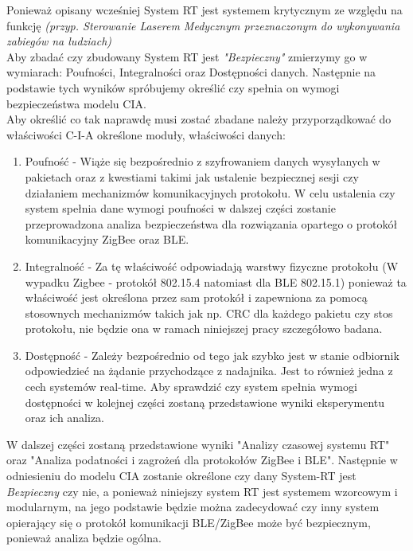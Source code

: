 \par
\tab Ponieważ opisany wcześniej System RT jest systemem krytycznym ze względu na funkcję \textit{(przyp. Sterowanie Laserem Medycznym przeznaczonym do wykonywania zabiegów na ludziach)} \\
Aby zbadać czy zbudowany System RT jest \textit{"Bezpieczny"} zmierzymy go w wymiarach: Poufności, Integralności oraz Dostępności danych. Następnie na podstawie tych wyników spróbujemy określić czy spełnia on wymogi bezpieczeństwa modelu CIA. \\
Aby określić co tak naprawdę musi zostać zbadane należy przyporządkować do właściwości C-I-A określone moduły, właściwości danych:
\begin{enumerate}
	\item Poufność - Wiąże się bezpośrednio z szyfrowaniem danych wysyłanych w pakietach oraz z kwestiami takimi jak ustalenie bezpiecznej sesji czy działaniem mechanizmów komunikacyjnych protokołu. W celu ustalenia czy system spełnia dane wymogi poufności w dalszej części zostanie przeprowadzona analiza bezpieczeństwa dla rozwiązania opartego o protokół komunikacyjny ZigBee oraz BLE.
	\item Integralność - Za tę właściwość odpowiadają warstwy fizyczne protokołu (W wypadku Zigbee - protokół 802.15.4 natomiast dla BLE 802.15.1) ponieważ ta właściwość jest określona przez sam protokół i zapewniona za pomocą stosownych mechanizmów takich jak np. CRC dla każdego pakietu czy stos protokołu, nie będzie ona w ramach niniejszej pracy szczegółowo badana.
	\item Dostępność - Zależy bezpośrednio od tego jak szybko jest w stanie odbiornik odpowiedzieć na żądanie przychodzące z nadajnika. Jest to również jedna z cech systemów real-time. Aby sprawdzić czy system spełnia wymogi dostępności w kolejnej części zostaną przedstawione wyniki eksperymentu oraz ich analiza.
\end{enumerate}

W dalszej części zostaną przedstawione wyniki "Analizy czasowej systemu RT" oraz "Analiza podatności i zagrożeń dla protokołów ZigBee i BLE". Następnie w odniesieniu do modelu CIA zostanie określone czy dany System-RT jest \textit{Bezpieczny} czy nie, a ponieważ niniejszy system RT jest systemem wzorcowym i modularnym, na jego podstawie będzie można zadecydować czy inny system opierający się o protokół komunikacji BLE/ZigBee może być bezpiecznym, ponieważ analiza będzie ogólna.

\clearpage